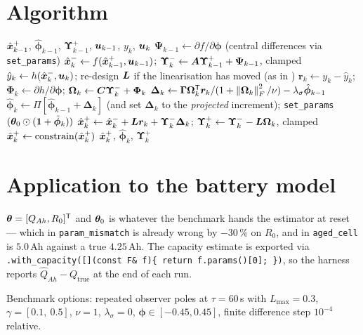 \section{Algorithm}
\begin{algorithm}[H]
\caption{AdaptiveObserver --- one sampling period}
\begin{algorithmic}[1]
\Require $\hat{\bm{x}}^{+}_{k-1}$, $\hat{\bm{\phi}}_{k-1}$, $\bm{\Upsilon}^+_{k-1}$, $\bm{u}_{k-1}$, $y_k$, $\bm{u}_k$
\State $\bm{\Psi}_{k-1}\gets \partial f/\partial\bm{\phi}$ (central differences via \texttt{set\_params})
\State $\hat{\bm{x}}^{-}_k \gets f(\hat{\bm{x}}^{+}_{k-1},\bm{u}_{k-1})$; \quad $\bm{\Upsilon}^-_k \gets \bm{A}\bm{\Upsilon}^+_{k-1} + \bm{\Psi}_{k-1}$, clamped
\State $\hat{y}_k \gets h(\hat{\bm{x}}^{-}_k,\bm{u}_k)$; \quad re-design $\bm{L}$ if the linearisation has moved (as in )
\State $\bm{r}_k \gets y_k-\hat{y}_k$; \quad $\bm{\Phi}_k \gets \partial h/\partial\bm{\phi}$; \quad $\bm{\Omega}_k \gets \bm{C}\bm{\Upsilon}^-_k+\bm{\Phi}_k$
\State $\bm{\Delta}_k \gets \bm{\Gamma}\bm{\Omega}_k^{\mathsf{T}}\bm{r}_k/(1+\left\lVert \bm{\Omega}_k \right\rVert_F^2/\nu) - \lambda_\sigma\hat{\bm{\phi}}_{k-1}$
\State $\hat{\bm{\phi}}_k \gets \Pi[\hat{\bm{\phi}}_{k-1}+\bm{\Delta}_k]$ (and set $\bm{\Delta}_k$ to the \emph{projected} increment); \quad \texttt{set\_params}$(\bm{\theta}_0\odot(\bm 1+\hat{\bm{\phi}}_k))$
\State $\hat{\bm{x}}^{+}_k \gets \hat{\bm{x}}^{-}_k + \bm{L}\bm{r}_k + \bm{\Upsilon}^-_k\bm{\Delta}_k$; \quad $\bm{\Upsilon}^+_k \gets \bm{\Upsilon}^-_k - \bm{L}\bm{\Omega}_k$, clamped
\State $\hat{\bm{x}}^{+}_k \gets \operatorname{constrain}(\hat{\bm{x}}^{+}_k)$
\Ensure $\hat{\bm{x}}^{+}_k$, $\hat{\bm{\phi}}_k$, $\bm{\Upsilon}^+_k$
\end{algorithmic}
\end{algorithm}

\section{Application to the battery model}
$\bm{\theta} = [Q_{Ah}, R_0]^{\mathsf{T}}$ and $\bm{\theta}_0$ is whatever the benchmark hands the estimator at
reset --- which in \texttt{param\_mismatch} is already wrong by $-30\,\%$ on $R_0$, and in
\texttt{aged\_cell} is $5.0$\,Ah against a true $4.25$\,Ah.  The capacity estimate is exported via
\texttt{.with\_capacity([](const F\& f)\{ return f.params()[0]; \})}, so the harness reports
$\hat{Q}_{Ah} - Q_{\mathrm{true}}$ at the end of each run.

Benchmark options: repeated observer poles at $\tau = 60$\,s with $L_{\max}=0.3$,
$\gamma = [0.1,\ 0.5]$, $\nu = 1$, $\lambda_\sigma = 0$, $\bm{\phi}\in[-0.45,0.45]$, finite
difference step $10^{-4}$ relative.

